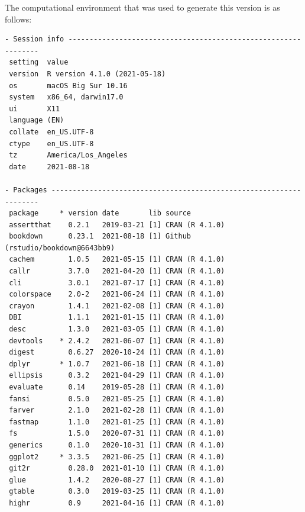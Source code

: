 \documentclass [11pt, proquest] {uwthesis}[2015/03/03]
\begin{document}
The computational environment that was used to generate this version is as follows:
\begin{verbatim}
- Session info ---------------------------------------------------------------
 setting  value                       
 version  R version 4.1.0 (2021-05-18)
 os       macOS Big Sur 10.16         
 system   x86_64, darwin17.0          
 ui       X11                         
 language (EN)                        
 collate  en_US.UTF-8                 
 ctype    en_US.UTF-8                 
 tz       America/Los_Angeles         
 date     2021-08-18                  

- Packages -------------------------------------------------------------------
 package     * version date       lib source                               
 assertthat    0.2.1   2019-03-21 [1] CRAN (R 4.1.0)                       
 bookdown      0.23.1  2021-08-18 [1] Github (rstudio/bookdown@6643bb9)    
 cachem        1.0.5   2021-05-15 [1] CRAN (R 4.1.0)                       
 callr         3.7.0   2021-04-20 [1] CRAN (R 4.1.0)                       
 cli           3.0.1   2021-07-17 [1] CRAN (R 4.1.0)                       
 colorspace    2.0-2   2021-06-24 [1] CRAN (R 4.1.0)                       
 crayon        1.4.1   2021-02-08 [1] CRAN (R 4.1.0)                       
 DBI           1.1.1   2021-01-15 [1] CRAN (R 4.1.0)                       
 desc          1.3.0   2021-03-05 [1] CRAN (R 4.1.0)                       
 devtools    * 2.4.2   2021-06-07 [1] CRAN (R 4.1.0)                       
 digest        0.6.27  2020-10-24 [1] CRAN (R 4.1.0)                       
 dplyr       * 1.0.7   2021-06-18 [1] CRAN (R 4.1.0)                       
 ellipsis      0.3.2   2021-04-29 [1] CRAN (R 4.1.0)                       
 evaluate      0.14    2019-05-28 [1] CRAN (R 4.1.0)                       
 fansi         0.5.0   2021-05-25 [1] CRAN (R 4.1.0)                       
 farver        2.1.0   2021-02-28 [1] CRAN (R 4.1.0)                       
 fastmap       1.1.0   2021-01-25 [1] CRAN (R 4.1.0)                       
 fs            1.5.0   2020-07-31 [1] CRAN (R 4.1.0)                       
 generics      0.1.0   2020-10-31 [1] CRAN (R 4.1.0)                       
 ggplot2     * 3.3.5   2021-06-25 [1] CRAN (R 4.1.0)                       
 git2r         0.28.0  2021-01-10 [1] CRAN (R 4.1.0)                       
 glue          1.4.2   2020-08-27 [1] CRAN (R 4.1.0)                       
 gtable        0.3.0   2019-03-25 [1] CRAN (R 4.1.0)                       
 highr         0.9     2021-04-16 [1] CRAN (R 4.1.0)                       

\end{verbatim}
\end{document}
